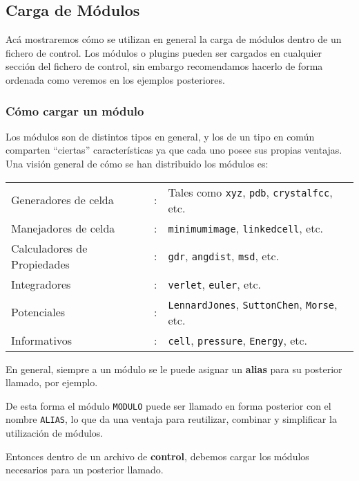 \subsection{Carga de M\'odulos}

Ac\'a mostraremos c\'omo se utilizan en general la carga de m\'odulos dentro de un fichero de control. Los m\'odulos o plugins pueden ser cargados en cualquier secci\'on del fichero de control, sin embargo recomendamos hacerlo de forma ordenada como veremos en los ejemplos posteriores.

\subsubsection{C\'omo cargar un m\'odulo}

Los m\'odulos son de distintos tipos en general, y los de un tipo en com\'un comparten ``ciertas'' caracter\'isticas ya que cada uno posee sus propias ventajas. Una visi\'on general de c\'omo se han distribuido los m\'odulos es: 

\begin{tabular}{lcl}
 Generadores de celda & : & Tales como \verb|xyz|, \verb|pdb|, \verb|crystalfcc|, etc. \\
 Manejadores de celda & : &\verb|minimumimage|, \verb|linkedcell|, etc. \\
 Calculadores de Propiedades & : & \verb|gdr|, \verb|angdist|, \verb|msd|, etc. \\
 Integradores & : & \verb|verlet|, \verb|euler|, etc. \\
 Potenciales & : & \verb|LennardJones|, \verb|SuttonChen|, \verb|Morse|, etc. \\
 Informativos & : & \verb|cell|, \verb|pressure|, \verb|Energy|, etc.
\end{tabular}

En general, siempre a un m\'odulo se le puede asignar un \textbf{alias} para su posterior llamado, por ejemplo.


De esta forma el m\'odulo \texttt{MODULO} puede ser llamado en forma posterior con el nombre \texttt{ALIAS}, lo que da una ventaja para reutilizar, combinar y simplificar la utilizaci\'on de m\'odulos.

Entonces dentro de un archivo de \textbf{control}, debemos cargar los m\'odulos necesarios para un posterior llamado.

